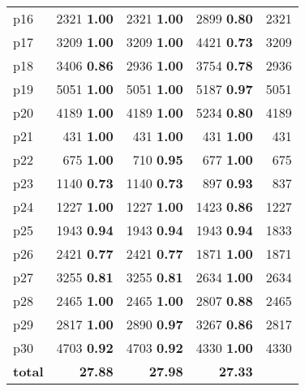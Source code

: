 \begin{tabular}{|l|rrr|r|}
p16 & {\footnotesize 2321} \textbf{1.00} & {\footnotesize 2321} \textbf{1.00} & {\footnotesize 2899} \textbf{0.80} & 2321\\
p17 & {\footnotesize 3209} \textbf{1.00} & {\footnotesize 3209} \textbf{1.00} & {\footnotesize 4421} \textbf{0.73} & 3209\\
p18 & {\footnotesize 3406} \textbf{0.86} & {\footnotesize 2936} \textbf{1.00} & {\footnotesize 3754} \textbf{0.78} & 2936\\
p19 & {\footnotesize 5051} \textbf{1.00} & {\footnotesize 5051} \textbf{1.00} & {\footnotesize 5187} \textbf{0.97} & 5051\\
p20 & {\footnotesize 4189} \textbf{1.00} & {\footnotesize 4189} \textbf{1.00} & {\footnotesize 5234} \textbf{0.80} & 4189\\
p21 & {\footnotesize 431} \textbf{1.00} & {\footnotesize 431} \textbf{1.00} & {\footnotesize 431} \textbf{1.00} & 431\\
p22 & {\footnotesize 675} \textbf{1.00} & {\footnotesize 710} \textbf{0.95} & {\footnotesize 677} \textbf{1.00} & 675\\
p23 & {\footnotesize 1140} \textbf{0.73} & {\footnotesize 1140} \textbf{0.73} & {\footnotesize 897} \textbf{0.93} & 837\\
p24 & {\footnotesize 1227} \textbf{1.00} & {\footnotesize 1227} \textbf{1.00} & {\footnotesize 1423} \textbf{0.86} & 1227\\
p25 & {\footnotesize 1943} \textbf{0.94} & {\footnotesize 1943} \textbf{0.94} & {\footnotesize 1943} \textbf{0.94} & 1833\\
p26 & {\footnotesize 2421} \textbf{0.77} & {\footnotesize 2421} \textbf{0.77} & {\footnotesize 1871} \textbf{1.00} & 1871\\
p27 & {\footnotesize 3255} \textbf{0.81} & {\footnotesize 3255} \textbf{0.81} & {\footnotesize 2634} \textbf{1.00} & 2634\\
p28 & {\footnotesize 2465} \textbf{1.00} & {\footnotesize 2465} \textbf{1.00} & {\footnotesize 2807} \textbf{0.88} & 2465\\
p29 & {\footnotesize 2817} \textbf{1.00} & {\footnotesize 2890} \textbf{0.97} & {\footnotesize 3267} \textbf{0.86} & 2817\\
p30 & {\footnotesize 4703} \textbf{0.92} & {\footnotesize 4703} \textbf{0.92} & {\footnotesize 4330} \textbf{1.00} & 4330\\
\hline
\textbf{total} & \textbf{27.88} & \textbf{27.98} & \textbf{27.33} & \\
\hline
\end{tabular}

